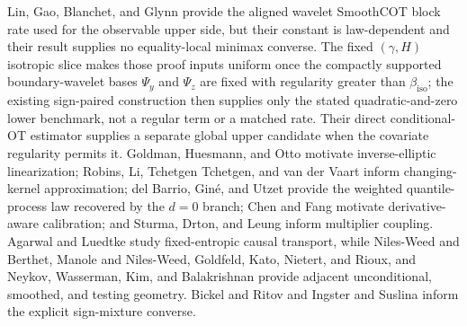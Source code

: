 Lin, Gao, Blanchet, and Glynn provide the aligned wavelet SmoothCOT block rate used for the observable upper side, but their constant is law-dependent and their result supplies no equality-local minimax converse. The fixed \((\gamma,H)\) isotropic slice makes those proof inputs uniform once the compactly supported boundary-wavelet bases \(\Psi_y\) and \(\Psi_z\) are fixed with regularity greater than \(\beta_{\mathrm{iso}}\); the existing sign-paired construction then supplies only the stated quadratic-and-zero lower benchmark, not a regular term or a matched rate. Their direct conditional-OT estimator supplies a separate global upper candidate when the covariate regularity permits it. Goldman, Huesmann, and Otto motivate inverse-elliptic linearization; Robins, Li, Tchetgen Tchetgen, and van der Vaart inform changing-kernel approximation; del Barrio, Gin\'e, and Utzet provide the weighted quantile-process law recovered by the \(d=0\) branch; Chen and Fang motivate derivative-aware calibration; and Sturma, Drton, and Leung inform multiplier coupling. Agarwal and Luedtke study fixed-entropic causal transport, while Niles-Weed and Berthet, Manole and Niles-Weed, Goldfeld, Kato, Nietert, and Rioux, and Neykov, Wasserman, Kim, and Balakrishnan provide adjacent unconditional, smoothed, and testing geometry. Bickel and Ritov and Ingster and Suslina inform the explicit sign-mixture converse.